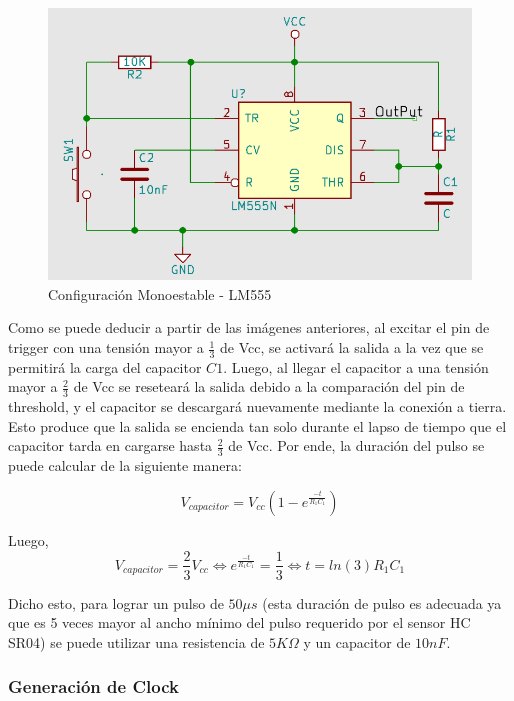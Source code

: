\begin{figure}[H]
\centering
\includegraphics[scale=0.4]{monoestable555.PNG}
\caption{Configuración Monoestable - LM555}
\end{figure}

Como se puede deducir a partir de las imágenes anteriores, al excitar
el pin de trigger con una tensión mayor a $\frac{1}{3}$ de Vcc,
se activará la salida a la vez que se permitirá la carga del capacitor
$C1$. Luego, al llegar el capacitor a una tensión mayor a $\frac{2}{3}$
de Vcc se reseteará la salida debido a la comparación del pin de threshold,
y el capacitor se descargará nuevamente mediante la conexión a tierra.
Esto produce que la salida se encienda tan solo durante el lapso de
tiempo que el capacitor tarda en cargarse hasta $\frac{2}{3}$ de
Vcc. Por ende, la duración del pulso se puede calcular de la siguiente
manera:

\begin{equation}
V_{capacitor}=V_{cc}(1-e^{\frac{-t}{R_{1}C_{1}}})
\end{equation}

Luego, 
\begin{equation}
V_{capacitor}=\frac{2}{3}V_{cc}\Longleftrightarrow e^{\frac{-t}{R_{1}C_{1}}}=\frac{1}{3}\Longleftrightarrow t=ln(3)R_{1}C_{1}    
\end{equation}


Dicho esto, para lograr un pulso de $50\mu s$ (esta duración de pulso
es adecuada ya que es 5 veces mayor al ancho mínimo del pulso requerido
por el sensor HC SR04) se puede utilizar una resistencia de $5K\Omega$
y un capacitor de $10nF$.

\subsubsection{Generación de Clock}

